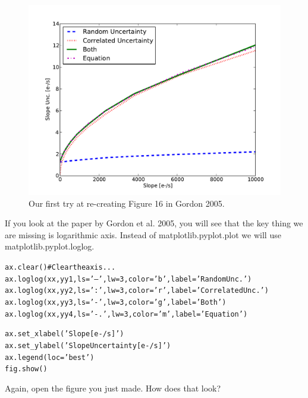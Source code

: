 \begin{figure}[tbp]
  \centering
    \includegraphics[scale=0.55]{splot.pdf}
    \caption{Our first try at re-creating Figure 16 in Gordon 2005.}
  \label{fig:splot}
\end{figure}

If you look at the paper by
Gordon et al. 2005, you will see that the key thing we are missing is
logarithmic axis.  Instead of {\sf \small matplotlib.pyplot.plot} we will use {\sf
\small matplotlib.pyplot.loglog}.

\begin{alltt}
  \pytab ax.clear()      # Clear the axis...
  \pytab ax.loglog(xx, yy1, ls='--', lw=3, color='b', label='Random Unc.')
  \pytab ax.loglog(xx, yy2, ls=':', lw=3, color='r', label='Correlated Unc.')
  \pytab ax.loglog(xx, yy3, ls='-', lw=3, color='g', label='Both')
  \pytab ax.loglog(xx, yy4, ls='-.', lw=3, color='m', label='Equation')

  \pytab ax.set_xlabel('Slope [e-/s]')
  \pytab ax.set_ylabel('Slope Uncertainty [e-/s]')
  \pytab ax.legend(loc='best')
  \pytab fig.show()
\end{alltt}

Again, open the figure you just made.  How does that look?  

